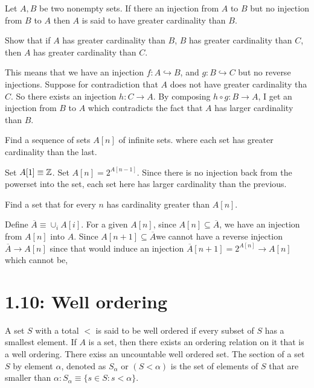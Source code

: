 \documentclass{article}
\begin{document}
Let $A, B$ be two nonempty sets. If there an injection from $A$ to $B$ but no injection from $B$ to $A$ then $A$ is said to have greater cardinality than $B$.

 Show that if $A$ has greater cardinality than $B$, $B$ has greater cardinality than $C$, then $A$ has greater cardinality than $C$.

\answer This means that we have an injection $f: A \hookrightarrow B$, and $g: B \hookrightarrow C$ but no reverse injections. Suppose for
contradiction that $A$ does not have greater cardinality tha $C$. So there exists an injection $h: C \rightarrow A$. By composing $h \circ g: B \rightarrow A$,
I get an injection from $B$ to $A$ which contradicts the fact that $A$ has larger cardinality than $B$.

 Find a sequence of sets $A[n]$ of infinite sets. where each set has greater cardinality than the last.

\answer Set $A[1] \equiv \mathbb Z$. Set $A[n] = 2^{A[n-1]}$. Since there is no injection back from the powerset into the set, each set here has larger cardinality than the previous.

 Find a set that for every $n$ has cardinality greater than $A[n]$.

Define $\overline A \equiv \cup_i A[i]$. For a given $A[n]$, since $A[n] \subseteq \overline A$,
we have an injection from $A[n]$ into $A$. Since 
$A[n+1] \subseteq \overline A$we cannot have a reverse
injection $\overline A \rightarrow A[n]$ since that would
induce an injection $\overline A[n+1] = 2^{A[n]} \rightarrow A[n]$ which cannot be,



\section{1.10: Well ordering}
 A set $S$ with a total $<$ is said to be well ordered if every subset of $S$ has a smallest element.
 If $A$ is a set, then there exists an ordering relation on it that is a well ordering.
 There exiss an uncountable well ordered set.
 The section of a set $S$ by element $\alpha$, denoted as $S_\alpha$ or $(S < \alpha)$ is the set of elements of $S$ that
are smaller than $\alpha: S_\alpha \equiv \{ s \in S : s < \alpha \}$.
\end{document}
